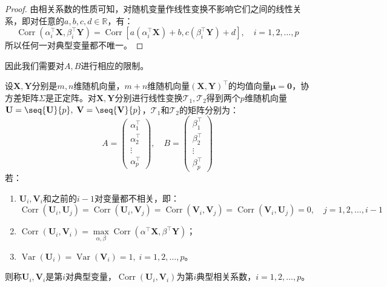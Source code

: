 \begin{proof}
	由相关系数的性质可知，对随机变量作线性变换不影响它们之间的线性关系，即对任意的$a,b,c,d\in\mathbb{R}$，有：
	\begin{equation*}
		\operatorname{Corr}(\alpha_i^{\top}\mathbf{X},\beta_i^{\top}\mathbf{Y})=\operatorname{Corr}[a(\alpha_i^{\top}\mathbf{X})+b,c(\beta_i^{\top}\mathbf{Y})+d],\quad i=1,2,\dots,p
	\end{equation*}
	所以任何一对典型变量都不唯一。
\end{proof}
因此我们需要对$A,B$进行相应的限制。
\begin{definition}
	设$\mathbf{X},\mathbf{Y}$分别是$m,n$维随机向量，$m+n$维随机向量$(\mathbf{X},\mathbf{Y})^{\top}$的均值向量$\boldsymbol{\mu}=\mathbf{0}$，协方差矩阵$\Sigma$是正定阵。对$\mathbf{X},\mathbf{Y}$分别进行线性变换$\mathcal{T}_1,\mathcal{T}_2$得到两个$p$维随机向量$\mathbf{U}=\seq{\mathbf{U}}{p},\;\mathbf{V}=\seq{\mathbf{V}}{p}$，$\mathcal{T}_1$和$\mathcal{T}_2$的矩阵分别为：
	\begin{equation*}
		A=
		\begin{pmatrix}
			\alpha_1^{\top} \\
			\alpha_2^{\top} \\
			\vdots \\
			\alpha_p^{\top}
		\end{pmatrix},\quad
		B=
		\begin{pmatrix}
			\beta_1^{\top} \\
			\beta_2^{\top} \\
			\vdots \\
			\beta_p^{\top}
		\end{pmatrix}
	\end{equation*}
	若：
	\begin{enumerate}
		\item $\mathbf{U}_i,\mathbf{V}_i$和之前的$i-1$对变量都不相关，即：
		\begin{equation*}
			\operatorname{Corr}(\mathbf{U}_i,\mathbf{U}_j)=\operatorname{Corr}(\mathbf{U}_i,\mathbf{V}_j)=\operatorname{Corr}(\mathbf{V}_i,\mathbf{V}_j)=\operatorname{Corr}(\mathbf{V}_i,\mathbf{U}_j)=0,\quad j=1,2,\dots,i-1
		\end{equation*}
		\item $\operatorname{Corr}(\mathbf{U}_i,\mathbf{V}_i)=\max\limits_{\alpha,\beta}\operatorname{Corr}(\alpha^{\top}\mathbf{X},\beta^{\top}\mathbf{Y})$；
		\item $\operatorname{Var}(\mathbf{U}_i)=\operatorname{Var}(\mathbf{V}_i)=1,\;i=1,2,\dots,p$。
	\end{enumerate}
	则称$\mathbf{U}_i,\mathbf{V}_i$是第$i$对典型变量，$\operatorname{Corr}(\mathbf{U}_i,\mathbf{V}_i)$为第$i$典型相关系数，$i=1,2,\dots,p$。
\end{definition}
